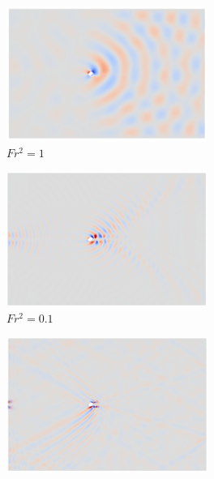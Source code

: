 \begin{figure}
    \begin{subfigure}[b]{0.32\textwidth}
        \centering
        \includegraphics[width=\textwidth]{images/spinning_ellipse/ar1p5fr1.png}
        \caption{$Fr^2 = 1$}
        \label{fig:ar1p5fr1}
    \end{subfigure}
    \hfill
    \begin{subfigure}[b]{0.32\textwidth}
        \centering
        \includegraphics[width=\textwidth]{images/spinning_ellipse/ar1p5fr0p3.png}
        \caption{$Fr^2 = 0.1$}
        \label{fig:ar1p5fr0p3}
    \end{subfigure}
    \hfill
    \begin{subfigure}[b]{0.32\textwidth}
        \centering
        \includegraphics[width=\textwidth]{images/spinning_ellipse/ar1p5fr0p1.png}

\end{subfigure}
\end{figure}
